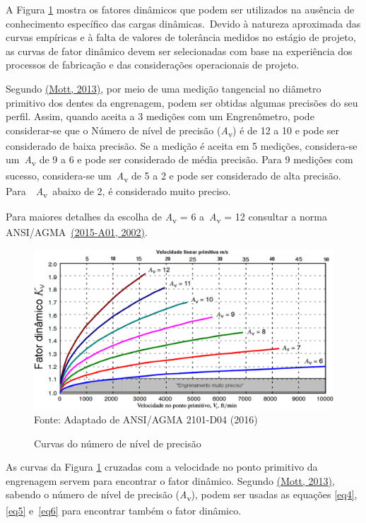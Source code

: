 \documentclass[12pt,a4paper]{article}
\begin{document}
A Figura {\ref{fig:5}} mostra os fatores dinâmicos que
podem ser utilizados na ausência de conhecimento específico das cargas
dinâmicas.~Devido à natureza aproximada das curvas empíricas e à falta
de valores de tolerância medidos no estágio de projeto, as curvas de
fator dinâmico devem ser selecionadas com base na experiência dos
processos de fabricação e das considerações operacionais de projeto.

Segundo \hyperref[csl:21]{(Mott, 2013)}, por meio de uma medição tangencial no
diâmetro primitivo dos dentes da engrenagem, podem ser obtidas algumas
precisões do seu perfil. Assim, quando aceita a 3 medições com um
Engrenômetro, pode considerar-se que o Número de nível de precisão
(\emph{A}\textsubscript{v}) é de 12 a 10 e pode ser considerado de baixa
precisão. Se a medição é aceita em 5 medições, considera-se
um~\emph{A}\textsubscript{v} de 9 a 6 e pode ser considerado de média
precisão. Para 9 medições com sucesso, considera-se
um~\emph{A}\textsubscript{v} de 5 a 2 e pode ser considerado de alta
precisão. Para~~\emph{A}\textsubscript{v}~abaixo de 2, é considerado
muito preciso.

Para maiores detalhes da escolha de \emph{A}\textsubscript{v} = 6
a~\emph{A}\textsubscript{v} = 12 consultar a norma
ANSI/AGMA~\hyperref[csl:23]{(2015-A01, 2002)}.

\begin{figure}[!htb]
    \centering
    \caption{Curvas do número de nível de precisão}
    \includegraphics[scale=0.57]{Imagens/Img5.png}\\
    {\footnotesize Fonte: Adaptado de ANSI/AGMA 2101-D04 (2016)}
    \label{fig:5}
\end{figure}

As curvas da Figura {\ref{fig:5}} cruzadas com a
velocidade no ponto primitivo da engrenagem servem para encontrar o
fator dinâmico. Segundo \hyperref[csl:21]{(Mott, 2013)}, sabendo o número de nível de
precisão (\emph{A}\textsubscript{v}), podem ser usadas as equações
{\ref{eq4}}, {\ref{eq5}} e~{\ref{eq6}} para encontrar também o fator dinâmico.
\end{document}
